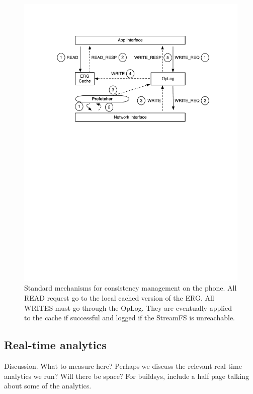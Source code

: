 \begin{figure}[htb!]
\begin{center}
\includegraphics[scale=0.50]{figs/standard_interaction}
\caption{Standard mechanisms for consistency management on the phone.  All READ request go to the local
cached version of the ERG.  All WRITES must go through the OpLog.  They are eventually applied to the cache
if successful and logged if the StreamFS is unreachable.}
\label{fig:interactions}
\end{center}
\end{figure}

\subsection{Real-time analytics}
Discussion.  What to measure here?  Perhaps we discuss the relevant real-time analytics we run?  Will there be space?  For buildsys, include a half page talking about some of the analytics.



